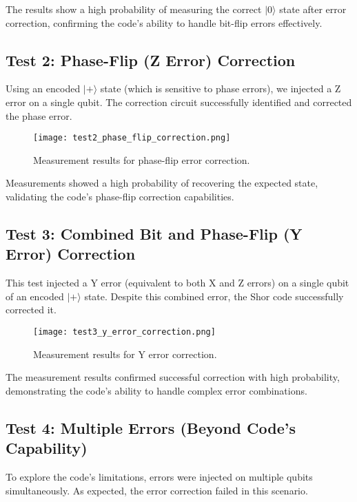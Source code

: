 \documentclass[12pt,a4paper]{article}
\begin{document}
The results show a high probability of measuring the correct $|0\rangle$ state after error correction, confirming the code's ability to handle bit-flip errors effectively.

\subsection{Test 2: Phase-Flip (Z Error) Correction}

Using an encoded $|+\rangle$ state (which is sensitive to phase errors), we injected a Z error on a single qubit. The correction circuit successfully identified and corrected the phase error.

\begin{figure}[H]
    \centering
    \texttt{[image: test2\_phase\_flip\_correction.png]}
    \caption{Measurement results for phase-flip error correction.}
    \label{fig:phase_flip_results}
\end{figure}

Measurements showed a high probability of recovering the expected state, validating the code's phase-flip correction capabilities.

\subsection{Test 3: Combined Bit and Phase-Flip (Y Error) Correction}

This test injected a Y error (equivalent to both X and Z errors) on a single qubit of an encoded $|+\rangle$ state. Despite this combined error, the Shor code successfully corrected it.

\begin{figure}[H]
    \centering
    \texttt{[image: test3\_y\_error\_correction.png]}
    \caption{Measurement results for Y error correction.}
    \label{fig:y_error_results}
\end{figure}

The measurement results confirmed successful correction with high probability, demonstrating the code's ability to handle complex error combinations.

\subsection{Test 4: Multiple Errors (Beyond Code's Capability)}

To explore the code's limitations, errors were injected on multiple qubits simultaneously. As expected, the error correction failed in this scenario.
\end{document}
